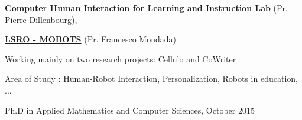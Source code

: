 \documentclass[10pt]{article}
\begin{document}
\begin{outerlist}
	\begin{small}
		
		
		\item[] \href{http://www.chili.epfl.ch/}{\textbf{Computer Human Interaction for Learning and Instruction Lab} (Pr. Pierre Dillenbourg)}, 
		\item[] \href{http://www.mobots.epfl.ch}{\textbf{LSRO - MOBOTS}} (Pr. Francesco Mondada) 
		\begin{innerlist}
			\item Working mainly on two research projects: Cellulo and CoWriter
			\item Area of Study : Human-Robot Interaction, Personalization, Robots in education, ...
		\end{innerlist}
	\end{small}
\end{outerlist}
\vspace{0.5cm}
 Ph.D in Applied Mathematics and Computer Sciences, October 2015
\end{document}
